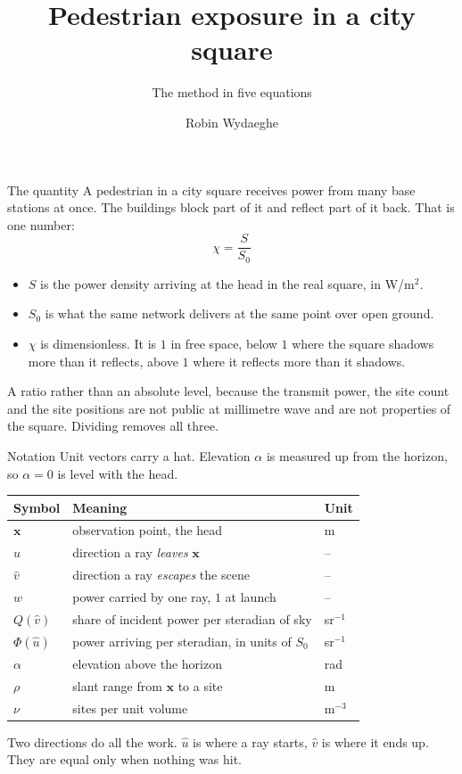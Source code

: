\documentclass[aspectratio=169,11pt]{beamer}
\title{Pedestrian exposure in a city square}
\subtitle{The method in five equations}
\author{Robin Wydaeghe}
\date{}
\newcommand{\uloc}{\hat{u}}
\newcommand{\uext}{\hat{v}}
\newcommand{\x}{\mathbf{x}}
\begin{document}
\begin{frame}
  \titlepage
\end{frame}

\begin{frame}{The quantity}
  A pedestrian in a city square receives power from many base stations at once.
  The buildings block part of it and reflect part of it back. That is one number:
  \begin{equation*}
    \boxed{\;\chi = \frac{S}{S_0}\;}
  \end{equation*}
  \begin{itemize}
    \item $S$ is the power density arriving at the head in the real square, in W/m$^2$.
    \item $S_0$ is what the same network delivers at the same point over open ground.
    \item $\chi$ is dimensionless. It is $1$ in free space, below $1$ where the
      square shadows more than it reflects, above $1$ where it reflects more than
      it shadows.
  \end{itemize}
  \vspace{0.4em}
  A ratio rather than an absolute level, because the transmit power, the site
  count and the site positions are not public at millimetre wave and are not
  properties of the square. Dividing removes all three.
\end{frame}

\begin{frame}{Notation}
  Unit vectors carry a hat. Elevation $\alpha$ is measured up from the horizon,
  so $\alpha = 0$ is level with the head.
  \begin{center}
    \begin{tabular}{lll}
      \toprule
      Symbol & Meaning & Unit \\
      \midrule
      $\x$        & observation point, the head          & m \\
      $\uloc$     & direction a ray {\itshape leaves} $\x$   & -- \\
      $\uext$     & direction a ray {\itshape escapes} the scene & -- \\
      $w$         & power carried by one ray, $1$ at launch & -- \\
      $Q(\uext)$  & share of incident power per steradian of sky & sr$^{-1}$ \\
      $\Phi(\uloc)$ & power arriving per steradian, in units of $S_0$ & sr$^{-1}$ \\
      $\alpha$    & elevation above the horizon          & rad \\
      $\rho$      & slant range from $\x$ to a site      & m \\
      $\nu$       & sites per unit volume                & m$^{-3}$ \\
      \bottomrule
    \end{tabular}
  \end{center}
  \vspace{0.3em}
  Two directions do all the work. $\uloc$ is where a ray starts, $\uext$ is
  where it ends up. They are equal only when nothing was hit.
\end{frame}
\end{document}
